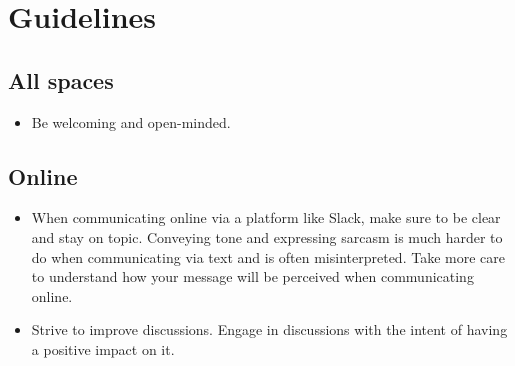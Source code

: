 \documentclass[12pt]{article}
\begin{document}
\section{Guidelines}

\subsection{All spaces}
\begin{itemize}
    \item Be welcoming and open-minded. 
\end{itemize}

\subsection{Online}
\begin{itemize}
    \item When communicating online via a platform like Slack, make sure to 
    be clear and stay on topic.  Conveying tone and expressing sarcasm is much
    harder to do when communicating via text and is often misinterpreted. Take 
    more care to understand how your message will be perceived when 
    communicating online.
    \item Strive to improve discussions.  Engage in discussions with the 
    intent of having a positive impact on it.  
\end{itemize}
\end{document}
